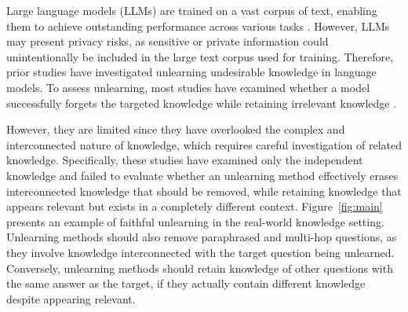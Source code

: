 Large language models (LLMs) are trained on a vast corpus of text, enabling them to achieve outstanding performance across various tasks \citep{radford2019language, chowdhery2023palm, team2024gemma}.
However, LLMs may present privacy risks, as sensitive or private information could unintentionally be included in the large text corpus used for training.
Therefore, prior studies have investigated unlearning undesirable knowledge in language models.
To assess unlearning, most studies have examined whether a model successfully forgets the targeted knowledge while retaining irrelevant knowledge \citep{shi2024muse, li2024wmdp, maini2024tofu, jin2024rwku}. 









However, they are limited since they have overlooked the complex and interconnected nature of knowledge, which requires careful investigation of related knowledge.
Specifically, these studies have examined only the independent knowledge and failed to evaluate whether an unlearning method effectively erases interconnected knowledge that should be removed, while retaining knowledge that appears relevant but exists in a completely different context.
Figure~\ref{fig:main} presents an example of faithful unlearning in the real-world knowledge setting.
Unlearning methods should also remove paraphrased and multi-hop questions, as they involve knowledge interconnected with the target question being unlearned.
Conversely, unlearning methods should retain knowledge of other questions with the same answer as the target, if they actually contain different knowledge despite appearing relevant.










